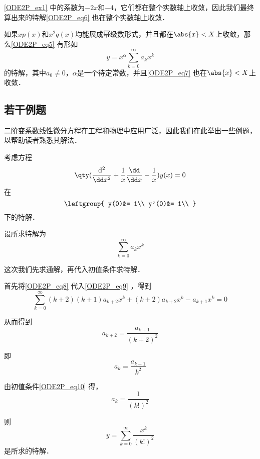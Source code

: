 \autoref{ODE2P_ex1} 中的系数为$-2x$和$-4$，它们都在整个实数轴上收敛，因此我们最终算出来的特解\autoref{ODE2P_eq6} 也在整个实数轴上收敛．

\begin{theorem}{}\label{ODE2P_the1}
如果$xp(x)$和$x^2q(x)$均能展成幂级数形式，并且都在$\abs{x}<X$上收敛，那么\autoref{ODE2P_eq5} 有形如
\begin{equation}\label{ODE2P_eq7}
y=x^\alpha\sum\limits_{k=0}^\infty a_kx^k
\end{equation}
的特解，其中$a_0\neq 0$，$\alpha$是一个待定常数，并且\autoref{ODE2P_eq7} 也在$\abs{x}<X$上收敛．


\end{theorem}


\subsection{若干例题}

二阶变系数线性微分方程在工程和物理中应用广泛，因此我们在此举出一些例题，以帮助读者熟悉其解法．

\begin{example}{}\label{ODE2P_ex2}
考虑方程
\begin{equation}\label{ODE2P_eq9}
\qty(\frac{\mathrm{d}^2}{\dd x^2}+\frac{1}{x}\frac{\dd}{\dd x}-\frac{1}{x})y(x)=0
\end{equation}
在
\begin{equation}\label{ODE2P_eq10}
\leftgroup{
    y(0)&= 1\\
    y'(0)&= 1\\
}
\end{equation}
下的特解．

设所求特解为
\begin{equation}\label{ODE2P_eq8}
\sum\limits_{k=0}^\infty a_kx^k
\end{equation}

这次我们先求通解，再代入初值条件求特解．

首先将\autoref{ODE2P_eq8} 代入\autoref{ODE2P_eq9} ，得到
\begin{equation}
\sum\limits_{k=0}^\infty (k+2)(k+1)a_{k+2}x^k+(k+2)a_{k+2}x^k-a_{k+1}x^k=0
\end{equation}

从而得到
\begin{equation}
a_{k+2}=\frac{a_{k+1}}{(k+2)^2}
\end{equation}

即
\begin{equation}\label{ODE2P_eq11}
a_k=\frac{a_{k-1}}{k^2}
\end{equation}

由初值条件\autoref{ODE2P_eq10} 得，
\begin{equation}
a_k=\frac{1}{(k!)^2}
\end{equation}

则
\begin{equation}
y=\sum\limits_{k=0}^\infty \frac{x^k}{(k!)^2}
\end{equation}
是所求的特解．


\end{example}


